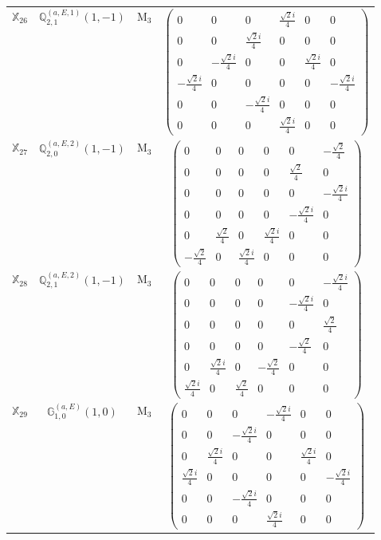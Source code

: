 \documentclass[fleqn,10pt,landscape]{article}
\begin{document}
\begin{itemize}
\begin{center}
\begin{longtable}{c|c|c|c}
$ \mathbb{X}_{26} $ & $\mathbb{Q}_{2,1}^{(a,E,1)}(1,-1)$ & M$_{3}$ & $\begin{pmatrix} 0 & 0 & 0 & \frac{\sqrt{2} i}{4} & 0 & 0 \\ 0 & 0 & \frac{\sqrt{2} i}{4} & 0 & 0 & 0 \\ 0 & - \frac{\sqrt{2} i}{4} & 0 & 0 & \frac{\sqrt{2} i}{4} & 0 \\ - \frac{\sqrt{2} i}{4} & 0 & 0 & 0 & 0 & - \frac{\sqrt{2} i}{4} \\ 0 & 0 & - \frac{\sqrt{2} i}{4} & 0 & 0 & 0 \\ 0 & 0 & 0 & \frac{\sqrt{2} i}{4} & 0 & 0 \end{pmatrix}$ \\
$ \mathbb{X}_{27} $ & $\mathbb{Q}_{2,0}^{(a,E,2)}(1,-1)$ & M$_{3}$ & $\begin{pmatrix} 0 & 0 & 0 & 0 & 0 & - \frac{\sqrt{2}}{4} \\ 0 & 0 & 0 & 0 & \frac{\sqrt{2}}{4} & 0 \\ 0 & 0 & 0 & 0 & 0 & - \frac{\sqrt{2} i}{4} \\ 0 & 0 & 0 & 0 & - \frac{\sqrt{2} i}{4} & 0 \\ 0 & \frac{\sqrt{2}}{4} & 0 & \frac{\sqrt{2} i}{4} & 0 & 0 \\ - \frac{\sqrt{2}}{4} & 0 & \frac{\sqrt{2} i}{4} & 0 & 0 & 0 \end{pmatrix}$ \\
$ \mathbb{X}_{28} $ & $\mathbb{Q}_{2,1}^{(a,E,2)}(1,-1)$ & M$_{3}$ & $\begin{pmatrix} 0 & 0 & 0 & 0 & 0 & - \frac{\sqrt{2} i}{4} \\ 0 & 0 & 0 & 0 & - \frac{\sqrt{2} i}{4} & 0 \\ 0 & 0 & 0 & 0 & 0 & \frac{\sqrt{2}}{4} \\ 0 & 0 & 0 & 0 & - \frac{\sqrt{2}}{4} & 0 \\ 0 & \frac{\sqrt{2} i}{4} & 0 & - \frac{\sqrt{2}}{4} & 0 & 0 \\ \frac{\sqrt{2} i}{4} & 0 & \frac{\sqrt{2}}{4} & 0 & 0 & 0 \end{pmatrix}$ \\
$ \mathbb{X}_{29} $ & $\mathbb{G}_{1,0}^{(a,E)}(1,0)$ & M$_{3}$ & $\begin{pmatrix} 0 & 0 & 0 & - \frac{\sqrt{2} i}{4} & 0 & 0 \\ 0 & 0 & - \frac{\sqrt{2} i}{4} & 0 & 0 & 0 \\ 0 & \frac{\sqrt{2} i}{4} & 0 & 0 & \frac{\sqrt{2} i}{4} & 0 \\ \frac{\sqrt{2} i}{4} & 0 & 0 & 0 & 0 & - \frac{\sqrt{2} i}{4} \\ 0 & 0 & - \frac{\sqrt{2} i}{4} & 0 & 0 & 0 \\ 0 & 0 & 0 & \frac{\sqrt{2} i}{4} & 0 & 0 \end{pmatrix}$ \\

\end{longtable}
\end{center}
\end{itemize}
\end{document}
